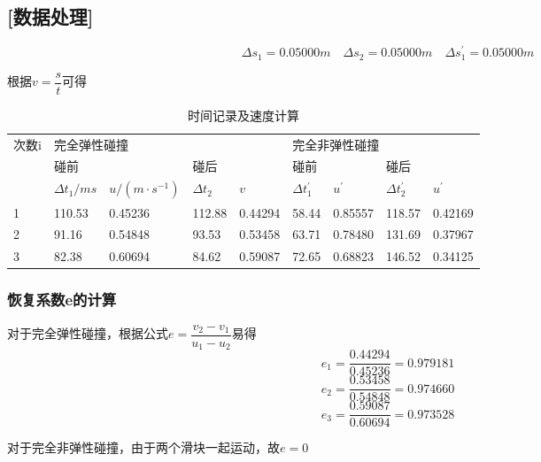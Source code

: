 \documentclass[UTF8]{article}
\begin{document}
	\subsection*{[数据处理]}
	\[\Delta s_1=0.05000m \quad \Delta s_2=0.05000m \quad \Delta s_1^{'}=0.05000m \]
	\par 根据$v = \dfrac{s}{t}$可得
	
	\begin{table}[h]
		\centering
		\begin{tabular}{|l|llll|llll|}
			\hline
			\multirow{3}{*}{次数i} & \multicolumn{4}{l|}{完全弹性碰撞}                                                            & \multicolumn{4}{l|}{完全非弹性碰撞}                                                           \\ \cline{2-9} 
			& \multicolumn{2}{l|}{碰前}                              & \multicolumn{2}{l|}{碰后}         & \multicolumn{2}{l|}{碰前}                              & \multicolumn{2}{l|}{碰后}         \\ \cline{2-9} 
			& \multicolumn{1}{l|}{$\Delta t_1/ms$}     & \multicolumn{1}{l|}{$u/(m\cdot s^{-1})$} & \multicolumn{1}{l|}{$\Delta t_2$}     & $v$ & \multicolumn{1}{l|}{$\Delta t_1^{'}$}     & \multicolumn{1}{l|}{$u^{'}$} & \multicolumn{1}{l|}{$\Delta t_2^{'}$}     & $u^{'}$ \\ \hline
			1                    & \multicolumn{1}{l|}{110.53} & \multicolumn{1}{l|}{0.45236} & \multicolumn{1}{l|}{112.88} & 0.44294 & \multicolumn{1}{l|}{58.44} & \multicolumn{1}{l|}{0.85557} & \multicolumn{1}{l|}{118.57} & 0.42169 \\ \hline
			
			2                    & \multicolumn{1}{l|}{91.16} & \multicolumn{1}{l|}{0.54848} & \multicolumn{1}{l|}{93.53} & 0.53458 & \multicolumn{1}{l|}{63.71} & \multicolumn{1}{l|}{0.78480} & \multicolumn{1}{l|}{131.69} & 0.37967 \\ \hline
			
			3                    & \multicolumn{1}{l|}{82.38} & \multicolumn{1}{l|}{0.60694} & \multicolumn{1}{l|}{84.62} & 0.59087 & \multicolumn{1}{l|}{72.65} & \multicolumn{1}{l|}{0.68823} & \multicolumn{1}{l|}{146.52} & 0.34125 \\ \hline
		\end{tabular}
		\caption{时间记录及速度计算}
	\end{table}
	\subsubsection*{恢复系数e的计算}
	对于完全弹性碰撞，根据公式$e=\dfrac{v_2-v_1}{u_1-u_2}$易得
	\[e_1 = \frac{0.44294}{0.45236}=0.979181 \]
	\[e_2 = \frac{0.53458}{0.54848}=0.974660\]
	\[e_3 = \frac{0.59087}{0.60694}=0.973528\]
	\par 对于完全非弹性碰撞，由于两个滑块一起运动，故$e=0$
\end{document}
